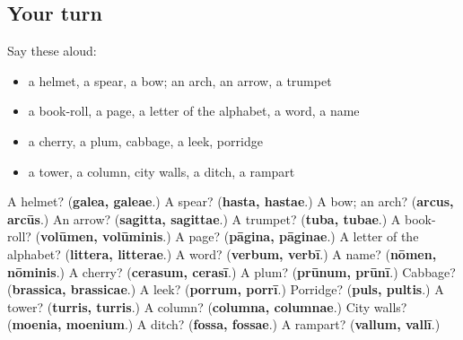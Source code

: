 \subsection*{Your turn}
Say these aloud:

\begin{itemize}
\raggedright
  \item a helmet, a spear, a bow; an arch, an arrow, a trumpet
  \item a book-roll, a page, a letter of the alphabet, a word, a name
  \item a cherry, a plum, cabbage, a leek, porridge
  \item a tower, a column, city walls, a ditch, a rampart
\end{itemize}

\begin{tcolorbox}[breakable,colback=teal!4,colframe=teal!35!black,title={Before you move on}]
A helmet? (\textbf{galea, galeae}.) A spear? (\textbf{hasta, hastae}.) A bow; an arch? (\textbf{arcus, arcūs}.) An arrow? (\textbf{sagitta, sagittae}.) A trumpet? (\textbf{tuba, tubae}.) A book-roll? (\textbf{volūmen, volūminis}.) A page? (\textbf{pāgina, pāginae}.) A letter of the alphabet? (\textbf{littera, litterae}.) A word? (\textbf{verbum, verbī}.) A name? (\textbf{nōmen, nōminis}.) A cherry? (\textbf{cerasum, cerasī}.) A plum? (\textbf{prūnum, prūnī}.) Cabbage? (\textbf{brassica, brassicae}.) A leek? (\textbf{porrum, porrī}.) Porridge? (\textbf{puls, pultis}.) A tower? (\textbf{turris, turris}.) A column? (\textbf{columna, columnae}.) City walls? (\textbf{moenia, moenium}.) A ditch? (\textbf{fossa, fossae}.) A rampart? (\textbf{vallum, vallī}.)
\end{tcolorbox}
